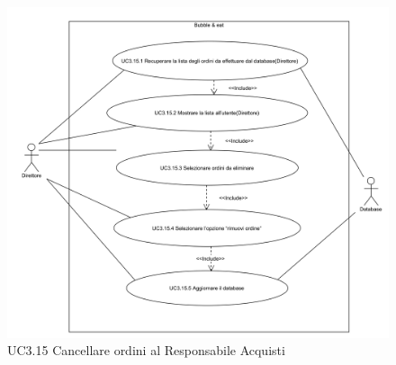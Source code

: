 \begin{figure}[H]
	\centering
	\includegraphics[width=15cm]{../../documenti/AnalisiDeiRequisiti/Diagrammi_img/uc3_15.png}
	\caption{UC3.15 Cancellare ordini al Responsabile Acquisti}
\end{figure}

